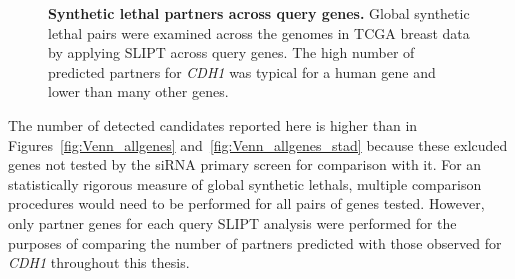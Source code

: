 \begin{figure}[!ht]
  \begin{center}
   \end{center}
   \caption[Synthetic lethal partners across query genes]{\small \textbf{Synthetic lethal partners across query genes.} Global \gls{synthetic lethal} pairs were examined across the \glspl{genome} in \gls{TCGA} breast  data by applying \gls{SLIPT} across query genes. The high number of predicted partners for \textit{CDH1} was typical for a human gene and lower than many other genes.
   }
\label{fig:global_SL}
\end{figure}

The number of detected candidates reported here is higher than in Figures~\ref{fig:Venn_allgenes} and~\ref{fig:Venn_allgenes_stad} because these exlcuded genes not tested by the \gls{siRNA} primary screen \citep{Telford2015} for comparison with it. For an statistically rigorous measure of global \glspl{synthetic lethal}, multiple comparison procedures would need to be performed for all pairs of genes tested. However, only partner genes for each query \gls{SLIPT} analysis were performed for the purposes of comparing the number of partners predicted with those observed for \textit{CDH1} throughout this thesis.


